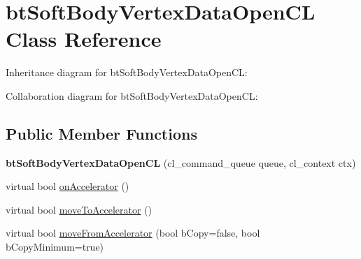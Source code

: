 \hypertarget{classbt_soft_body_vertex_data_open_c_l}{\section{bt\+Soft\+Body\+Vertex\+Data\+Open\+C\+L Class Reference}
\label{classbt_soft_body_vertex_data_open_c_l}
}


Inheritance diagram for bt\+Soft\+Body\+Vertex\+Data\+Open\+C\+L\+:


Collaboration diagram for bt\+Soft\+Body\+Vertex\+Data\+Open\+C\+L\+:
\subsection*{Public Member Functions}
\begin{DoxyCompactItemize}
\item 
\hypertarget{classbt_soft_body_vertex_data_open_c_l_aa52e7345d905a5bf0b3dd6798c894db1}{{\bfseries bt\+Soft\+Body\+Vertex\+Data\+Open\+C\+L} (cl\+\_\+command\+\_\+queue queue, cl\+\_\+context ctx)}\label{classbt_soft_body_vertex_data_open_c_l_aa52e7345d905a5bf0b3dd6798c894db1}

\item 
virtual bool \hyperlink{classbt_soft_body_vertex_data_open_c_l_a0277617dbd360ea14ec7848f85b69f4c}{on\+Accelerator} ()
\item 
virtual bool \hyperlink{classbt_soft_body_vertex_data_open_c_l_abd4012054faecf26669f00a04bfd6170}{move\+To\+Accelerator} ()
\item 
virtual bool \hyperlink{classbt_soft_body_vertex_data_open_c_l_a0ea115bf64323883e19e7bde57a998f1}{move\+From\+Accelerator} (bool b\+Copy=false, bool b\+Copy\+Minimum=true)
\end{DoxyCompactItemize}
